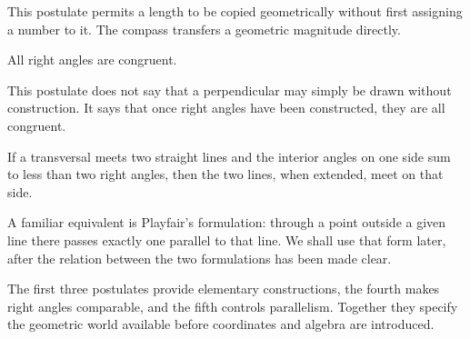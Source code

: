\begin{interpretationbox}
This postulate permits a length to be copied geometrically without first
assigning a number to it. The compass transfers a geometric magnitude directly.
\end{interpretationbox}

\begin{corebox}
All right angles are congruent.
\end{corebox}

\begin{center}
\end{center}

\begin{remarkbox}
This postulate does not say that a perpendicular may simply be drawn without
construction. It says that once right angles have been constructed, they are all
congruent.
\end{remarkbox}

\begin{corebox}
If a transversal meets two straight lines and the interior angles on one side
sum to less than two right angles, then the two lines, when extended, meet on
that side.
\end{corebox}

\begin{center}
\end{center}

\begin{interpretationbox}
A familiar equivalent is Playfair's formulation: through a point outside a
given line there passes exactly one parallel to that line. We shall use that
form later, after the relation between the two formulations has been made clear.
\end{interpretationbox}

\begin{summarybox}
The first three postulates provide elementary constructions, the fourth makes
right angles comparable, and the fifth controls parallelism. Together they
specify the geometric world available before coordinates and algebra are
introduced.
\end{summarybox}
